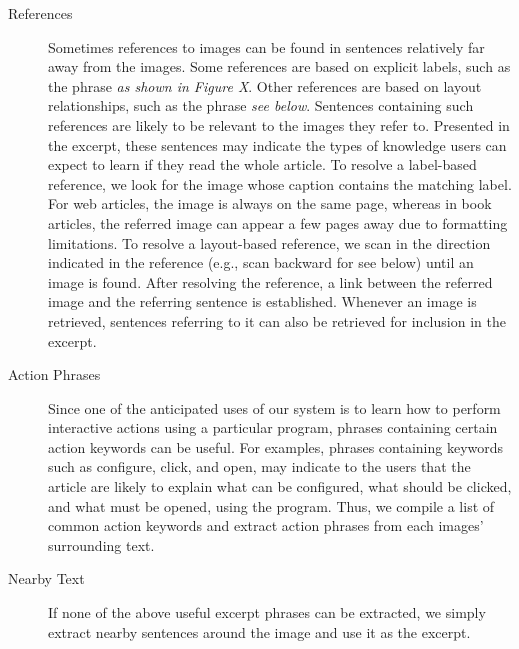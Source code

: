 \documentclass{www2010-submission}
\begin{document}
\begin{description}
\item[References] Sometimes references to images can be found in
  sentences relatively far away from the images. Some references are based
  on explicit labels, such as the phrase \emph{as shown in Figure
    X}. Other references are based on layout relationships, such as 
  the phrase \emph{see below}. Sentences containing such
  references are likely to be relevant to the images they refer
  to. Presented in the excerpt, these sentences may indicate the types
  of knowledge users can expect to learn if they read the whole
  article. To resolve a label-based reference, we look for the image
  whose caption contains the matching label. For web articles, the
  image is always on the same page, whereas in book articles, the
  referred image can appear a few pages away due to formatting
  limitations. To resolve a layout-based reference, we scan in the
  direction indicated in the reference (e.g., scan backward for see
  below) until an image is found. After resolving the reference, a
  link between the referred image and the referring sentence is
  established. Whenever an image is retrieved, sentences referring to
  it can also be retrieved for inclusion in the excerpt.

\item[Action Phrases] Since one of the anticipated uses of our system
  is to learn how to perform interactive actions using a particular
  program, phrases containing certain action keywords can
  be useful. For examples, phrases containing keywords such as
  configure, click, and open, may indicate to the users that the
  article are likely to explain what can be configured, what should be
  clicked, and what must be opened, using the program. Thus, we
  compile a list of common action keywords and extract action phrases
  from each images' surrounding text.

\item[Nearby Text] If none of the above useful excerpt phrases can be
  extracted, we simply extract nearby sentences around the image and
  use it as the excerpt.


\end{description}
\end{document}
